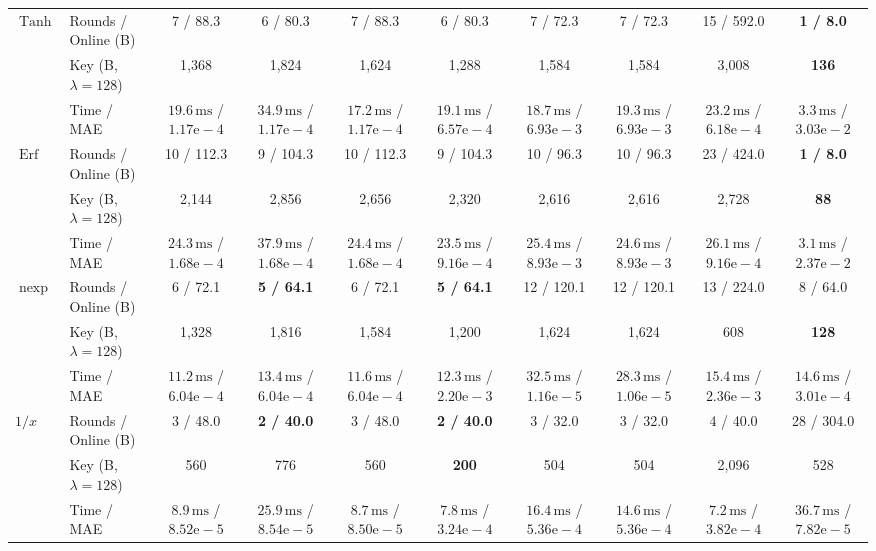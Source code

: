 \begin{tabular}{@{}llcccccccc@{}}
\midrule
\multirow{3}{*}{$\operatorname{Tanh}$}
 & Rounds / Online (B) & 7 / 88.3 & 6 / 80.3 & 7 / 88.3 & 6 / 80.3 & 7 / 72.3 & 7 / 72.3 & 15 / 592.0 & \textbf{1 / 8.0} \\
 & Key (B, $\lambda{=}128$) & 1,368 & 1,824 & 1,624 & 1,288 & 1,584 & 1,584 & 3,008 & \textbf{136} \\
 & Time / MAE & $19.6\,\text{ms}$ / $1.17\text{e}-4$ & $34.9\,\text{ms}$ / $1.17\text{e}-4$ & $17.2\,\text{ms}$ / $1.17\text{e}-4$ & $19.1\,\text{ms}$ / $6.57\text{e}-4$ & $18.7\,\text{ms}$ / $6.93\text{e}-3$ & $19.3\,\text{ms}$ / $6.93\text{e}-3$ & $23.2\,\text{ms}$ / $6.18\text{e}-4$ & $3.3\,\text{ms}$ / $3.03\text{e}-2$ \\
\midrule
\multirow{3}{*}{$\operatorname{Erf}$}
 & Rounds / Online (B) & 10 / 112.3 & 9 / 104.3 & 10 / 112.3 & 9 / 104.3 & 10 / 96.3 & 10 / 96.3 & 23 / 424.0 & \textbf{1 / 8.0} \\
 & Key (B, $\lambda{=}128$) & 2,144 & 2,856 & 2,656 & 2,320 & 2,616 & 2,616 & 2,728 & \textbf{88} \\
 & Time / MAE & $24.3\,\text{ms}$ / $1.68\text{e}-4$ & $37.9\,\text{ms}$ / $1.68\text{e}-4$ & $24.4\,\text{ms}$ / $1.68\text{e}-4$ & $23.5\,\text{ms}$ / $9.16\text{e}-4$ & $25.4\,\text{ms}$ / $8.93\text{e}-3$ & $24.6\,\text{ms}$ / $8.93\text{e}-3$ & $26.1\,\text{ms}$ / $9.16\text{e}-4$ & $3.1\,\text{ms}$ / $2.37\text{e}-2$ \\
\midrule
\multirow{3}{*}{$\operatorname{nexp}$}
 & Rounds / Online (B) & 6 / 72.1 & \textbf{5 / 64.1} & 6 / 72.1 & \textbf{5 / 64.1} & 12 / 120.1 & 12 / 120.1 & 13 / 224.0 & 8 / 64.0 \\
 & Key (B, $\lambda{=}128$) & 1,328 & 1,816 & 1,584 & 1,200 & 1,624 & 1,624 & 608 & \textbf{128} \\
 & Time / MAE & $11.2\,\text{ms}$ / $6.04\text{e}-4$ & $13.4\,\text{ms}$ / $6.04\text{e}-4$ & $11.6\,\text{ms}$ / $6.04\text{e}-4$ & $12.3\,\text{ms}$ / $2.20\text{e}-3$ & $32.5\,\text{ms}$ / $1.16\text{e}-5$ & $28.3\,\text{ms}$ / $1.06\text{e}-5$ & $15.4\,\text{ms}$ / $2.36\text{e}-3$ & $14.6\,\text{ms}$ / $3.01\text{e}-4$ \\
\midrule
\multirow{3}{*}{$1/x$}
 & Rounds / Online (B) & 3 / 48.0 & \textbf{2 / 40.0} & 3 / 48.0 & \textbf{2 / 40.0} & 3 / 32.0 & 3 / 32.0 & 4 / 40.0 & 28 / 304.0 \\
 & Key (B, $\lambda{=}128$) & 560 & 776 & 560 & \textbf{200} & 504 & 504 & 2,096 & 528 \\
 & Time / MAE & $8.9\,\text{ms}$ / $8.52\text{e}-5$ & $25.9\,\text{ms}$ / $8.54\text{e}-5$ & $8.7\,\text{ms}$ / $8.50\text{e}-5$ & $7.8\,\text{ms}$ / $3.24\text{e}-4$ & $16.4\,\text{ms}$ / $5.36\text{e}-4$ & $14.6\,\text{ms}$ / $5.36\text{e}-4$ & $7.2\,\text{ms}$ / $3.82\text{e}-4$ & $36.7\,\text{ms}$ / $7.82\text{e}-5$ \\

\end{tabular}
